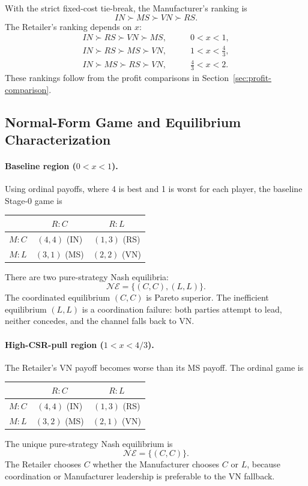 With the strict fixed-cost tie-break, the Manufacturer's ranking is
\begin{equation*}
    IN\succ MS\succ VN\succ RS.
\end{equation*}
The Retailer's ranking depends on $x$:
\begin{align*}
    IN\succ RS\succ VN\succ MS, \qquad &0<x<1,\\
    IN\succ RS\succ MS\succ VN, \qquad &1<x<\frac43,\\
    IN\succ MS\succ RS\succ VN, \qquad &\frac43<x<2.
\end{align*}
These rankings follow from the profit comparisons in Section~\ref{sec:profit-comparison}.

\subsection{Normal-Form Game and Equilibrium Characterization}

\paragraph{Baseline region ($0<x<1$).}
Using ordinal payoffs, where 4 is best and 1 is worst for each player, the baseline Stage-0 game is
\begin{center}
\renewcommand{\arraystretch}{1.2}
\begin{tabular}{c|cc}
 & $R:C$ & $R:L$\\ \hline
$M:C$ & $(4,4)$ (IN) & $(1,3)$ (RS)\\
$M:L$ & $(3,1)$ (MS) & $(2,2)$ (VN)\\
\end{tabular}
\end{center}
There are two pure-strategy Nash equilibria:
\begin{equation*}
    \mathcal{NE}=\{(C,C),(L,L)\}.
\end{equation*}
The coordinated equilibrium $(C,C)$ is Pareto superior. The inefficient equilibrium $(L,L)$ is a coordination failure: both parties attempt to lead, neither concedes, and the channel falls back to VN.

\paragraph{High-CSR-pull region ($1<x<4/3$).}
The Retailer's VN payoff becomes worse than its MS payoff. The ordinal game is
\begin{center}
\renewcommand{\arraystretch}{1.2}
\begin{tabular}{c|cc}
 & $R:C$ & $R:L$\\ \hline
$M:C$ & $(4,4)$ (IN) & $(1,3)$ (RS)\\
$M:L$ & $(3,2)$ (MS) & $(2,1)$ (VN)\\
\end{tabular}
\end{center}
The unique pure-strategy Nash equilibrium is
\begin{equation*}
    \mathcal{NE}=\{(C,C)\}.
\end{equation*}
The Retailer chooses $C$ whether the Manufacturer chooses $C$ or $L$, because coordination or Manufacturer leadership is preferable to the VN fallback.

